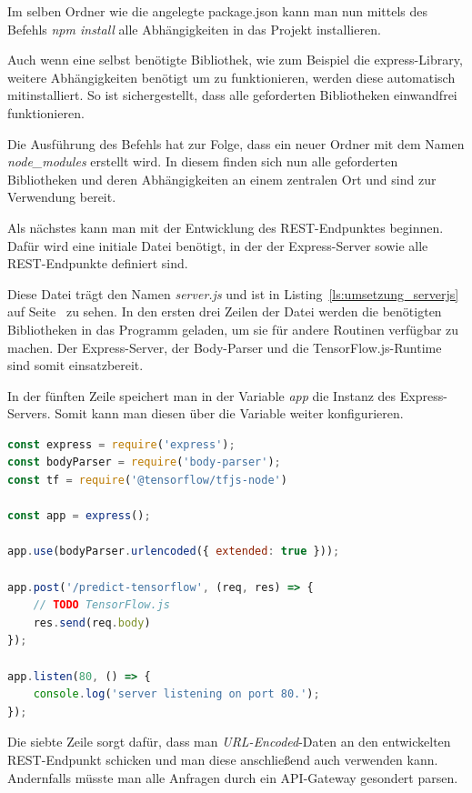Im selben Ordner wie die angelegte package.json kann man nun mittels des Befehls \textit{npm install} alle
Abhängigkeiten in das Projekt installieren.

Auch wenn eine selbst benötigte Bibliothek, wie zum Beispiel die express-Library, weitere Abhängigkeiten benötigt um zu
funktionieren, werden diese automatisch mitinstalliert. So ist sichergestellt, dass alle geforderten Bibliotheken
einwandfrei funktionieren.

Die Ausführung des Befehls hat zur Folge, dass ein neuer Ordner mit dem Namen \textit{node\_modules} erstellt wird. In
diesem finden sich nun alle geforderten Bibliotheken und deren Abhängigkeiten an einem zentralen Ort und sind zur
Verwendung bereit.

Als nächstes kann man mit der Entwicklung des REST-Endpunktes beginnen. Dafür wird eine initiale Datei benötigt, in der
der Express-Server sowie alle REST-Endpunkte definiert sind.

Diese Datei trägt den Namen \textit{server.js} und ist in Listing~\ref{ls:umsetzung_serverjs} auf 
Seite~\pageref{ls:umsetzung_serverjs} zu sehen. In den ersten drei Zeilen der Datei werden die benötigten Bibliotheken
in das Programm geladen, um sie für andere Routinen verfügbar zu machen. Der Express-Server, der Body-Parser und die
TensorFlow.js-Runtime sind somit einsatzbereit.

In der fünften Zeile speichert man in der Variable \textit{app} die Instanz des Express-Servers. Somit kann man diesen
über die Variable weiter konfigurieren.

\begin{lstlisting}[language=JavaScript, caption=Die komplette server.js, label=ls:umsetzung_serverjs]
const express = require('express');
const bodyParser = require('body-parser');
const tf = require('@tensorflow/tfjs-node')

const app = express();

app.use(bodyParser.urlencoded({ extended: true }));

app.post('/predict-tensorflow', (req, res) => {
    // TODO TensorFlow.js
    res.send(req.body)
});

app.listen(80, () => {
    console.log('server listening on port 80.');
});
\end{lstlisting}

Die siebte Zeile sorgt dafür, dass man \textit{URL-Encoded}-Daten an den entwickelten REST-Endpunkt schicken und man
diese anschließend auch verwenden kann. Andernfalls müsste man alle Anfragen durch ein API-Gateway gesondert parsen.


